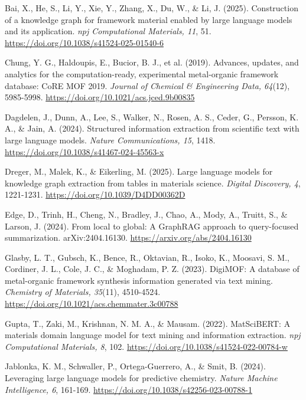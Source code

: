 \documentclass[11pt,a4paper,oneside]{report}
\begin{document}
Bai, X., He, S., Li, Y., Xie, Y., Zhang, X., Du, W., \& Li, J. (2025). Construction of a knowledge graph for framework material enabled by large language models and its application. \emph{npj Computational Materials, 11}, 51. \href{https://doi.org/10.1038/s41524-025-01540-6}{https://doi.org/10.1038/s41524-025-01540-6}

Chung, Y. G., Haldoupis, E., Bucior, B. J., et al. (2019). Advances, updates, and analytics for the computation-ready, experimental metal-organic framework database: CoRE MOF 2019. \emph{Journal of Chemical \& Engineering Data, 64}(12), 5985-5998. \href{https://doi.org/10.1021/acs.jced.9b00835}{https://doi.org/10.1021/acs.jced.9b00835}

Dagdelen, J., Dunn, A., Lee, S., Walker, N., Rosen, A. S., Ceder, G., Persson, K. A., \& Jain, A. (2024). Structured information extraction from scientific text with large language models. \emph{Nature Communications, 15}, 1418. \href{https://doi.org/10.1038/s41467-024-45563-x}{https://doi.org/10.1038/s41467-024-45563-x}

Dreger, M., Malek, K., \& Eikerling, M. (2025). Large language models for knowledge graph extraction from tables in materials science. \emph{Digital Discovery, 4}, 1221-1231. \href{https://doi.org/10.1039/D4DD00362D}{https://doi.org/10.1039/D4DD00362D}

Edge, D., Trinh, H., Cheng, N., Bradley, J., Chao, A., Mody, A., Truitt, S., \& Larson, J. (2024). From local to global: A GraphRAG approach to query-focused summarization. arXiv:2404.16130. \href{https://arxiv.org/abs/2404.16130}{https://arxiv.org/abs/2404.16130}

Glasby, L. T., Gubsch, K., Bence, R., Oktavian, R., Isoko, K., Moosavi, S. M., Cordiner, J. L., Cole, J. C., \& Moghadam, P. Z. (2023). DigiMOF: A database of metal-organic framework synthesis information generated via text mining. \emph{Chemistry of Materials, 35}(11), 4510-4524. \href{https://doi.org/10.1021/acs.chemmater.3c00788}{https://doi.org/10.1021/acs.chemmater.3c00788}

Gupta, T., Zaki, M., Krishnan, N. M. A., \& Mausam. (2022). MatSciBERT: A materials domain language model for text mining and information extraction. \emph{npj Computational Materials, 8}, 102. \href{https://doi.org/10.1038/s41524-022-00784-w}{https://doi.org/10.1038/s41524-022-00784-w}

Jablonka, K. M., Schwaller, P., Ortega-Guerrero, A., \& Smit, B. (2024). Leveraging large language models for predictive chemistry. \emph{Nature Machine Intelligence, 6}, 161-169. \href{https://doi.org/10.1038/s42256-023-00788-1}{https://doi.org/10.1038/s42256-023-00788-1}
\end{document}
